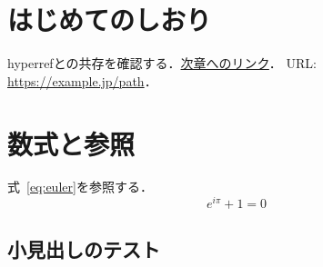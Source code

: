 \documentclass[pdflatex]{jlreq}
\begin{document}
\section{はじめてのしおり}\label{sec:one}
hyperrefとの共存を確認する．\hyperref[sec:two]{次章へのリンク}．
URL: \url{https://example.jp/path}．
\section{数式と参照}\label{sec:two}
式~\ref{eq:euler}を参照する．
\begin{equation}e^{i\pi}+1=0\label{eq:euler}\end{equation}
\subsection{小見出しのテスト}
\end{document}
